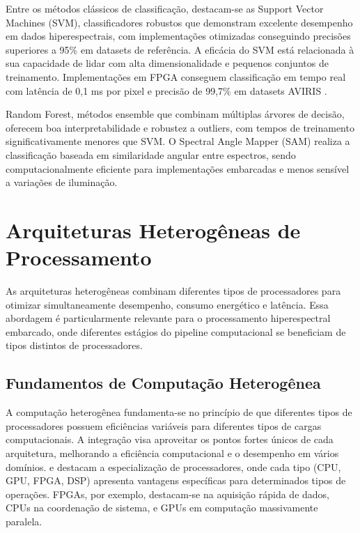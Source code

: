 Entre os métodos clássicos de classificação, destacam-se as Support Vector
Machines (SVM), classificadores robustos que demonstram excelente desempenho em
dados hiperespectrais, com implementações otimizadas conseguindo precisões
superiores a 95\% em datasets de referência. A eficácia do SVM está relacionada à
sua capacidade de lidar com alta dimensionalidade e pequenos conjuntos de
treinamento. Implementações em FPGA conseguem classificação em tempo real com
latência de 0,1 ms por pixel e precisão de 99,7\% em datasets AVIRIS
\cite{Martins2019}.

Random Forest, métodos ensemble que combinam múltiplas árvores de decisão,
oferecem boa interpretabilidade e robustez a outliers, com tempos de treinamento
significativamente menores que SVM. O Spectral Angle Mapper (SAM) realiza a
classificação baseada em similaridade angular entre espectros, sendo
computacionalmente eficiente para implementações embarcadas e menos sensível a
variações de iluminação.

\section{Arquiteturas Heterogêneas de Processamento}
\label{sec:arquiteturas_heterogeneas}

As arquiteturas heterogêneas combinam diferentes tipos de processadores para
otimizar simultaneamente desempenho, consumo energético e latência. Essa
abordagem é particularmente relevante para o processamento hiperespectral
embarcado, onde diferentes estágios do pipeline computacional se beneficiam de
tipos distintos de processadores.

\subsection{Fundamentos de Computação Heterogênea}
\label{subsec:fundamentos_heterogenea}

A computação heterogênea fundamenta-se no princípio de que diferentes tipos de
processadores possuem eficiências variáveis para diferentes tipos de cargas
computacionais. A integração visa aproveitar os pontos fortes únicos de cada
arquitetura, melhorando a eficiência computacional e o desempenho em vários
domínios. \textcite{Vaithianathan2025} e \textcite{SahovicQuinten2025} destacam
a especialização de processadores, onde cada tipo (CPU, GPU, FPGA, DSP)
apresenta vantagens específicas para determinados tipos de operações. FPGAs, por
exemplo, destacam-se na aquisição rápida de dados, CPUs na coordenação de
sistema, e GPUs em computação massivamente paralela.

